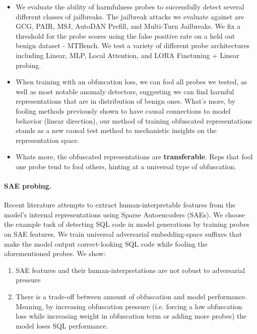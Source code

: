 \documentclass{article}
\begin{document}
\begin{itemize}
    \item We evaluate the ability of harmfulness probes to successfully detect several different classes of jailbreaks.  The jailbreak attacks we evaluate against are GCG, PAIR, MSJ, AutoDAN Prefill, and Multi-Turn Jailbreaks. We fix a threshold for the probe scores using the false positive rate on a held out benign dataset - MTBench.
    We test a variety of different probe architectures including Linear, MLP, Local Attention, and LORA Finetuning + Linear probing.
    \item When training with an obfuscation loss, we can
    fool all probes we tested, as well as most notable 
    anomaly detectors, suggesting we can find
    harmful representations that are in distribution 
    of benign ones. What's more, by fooling methods
    previously shown to have causal connections 
    to model behavior (linear direction), our
    method of training obfuscated representations 
    stands as a new causal test method 
    to mechanistic insights on the representation space.
    \item Whats more, the obfuscated representations 
    are \textbf{transferable}. Reps that 
    fool one probe tend to fool others, 
    hinting at a universal type of obfuscation.
\end{itemize}

\paragraph{SAE probing.} Recent literature attempts to extract human-interpretable features from the model's internal representations using Sparse Autoencoders (SAEs). We choose the example task of detecting SQL code in model generations by training probes on SAE features. We train universal adversarial embedding-space suffixes that make the model output correct-looking SQL code while fooling the aforementioned probes. We show: 
\begin{enumerate}
    \item SAE features and their human-interpretations are not robust to adversarial pressure
    \item There is a trade-off between amount of obfuscation and model performance. Meaning, by increasing obfuscation pressure (i.e. forcing a low obfuscation loss while increasing weight in obfuscation term or adding more probes) the model loses SQL performance.
\end{enumerate}
\end{document}

